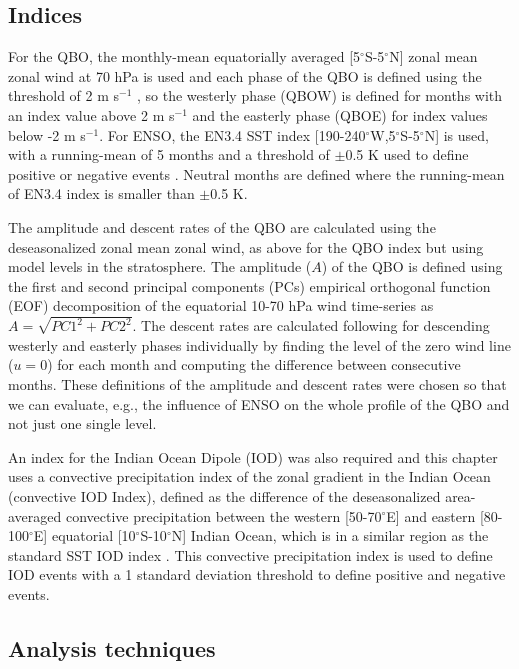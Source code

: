 \subsection{Indices}
\label{sq:indices}

For the QBO, the monthly-mean equatorially averaged [5$^\circ$S-5$^\circ$N] zonal mean zonal wind at 70 hPa is used  and each phase of the QBO is defined using the threshold of 2 m s$^{-1}$ \citep{garfinkel2010}, so the westerly phase (QBOW) is defined for months with an index value above 2 m s$^{-1}$ and the easterly phase (QBOE) for index values below -2 m s$^{-1}$. For ENSO, the EN3.4 SST index [190-240$^\circ$W,5$^\circ$S-5$^\circ$N] is used, with a running-mean of 5 months and a threshold of $\pm$0.5 K used to define positive or negative events \citep{trenberth1998}. Neutral months are defined where the running-mean of EN3.4 index is smaller than $\pm$0.5 K.

The amplitude and descent rates of the QBO are calculated using the deseasonalized zonal mean zonal wind, as above for the QBO index but using  model levels in the stratosphere.
The amplitude ($A$) of the QBO is defined using the first and second principal components (PCs)  empirical orthogonal function (EOF) decomposition of the equatorial 10-70 hPa wind time-series \citep{serva2020} as $A=\sqrt{PC1^2+PC2^2}$.
The descent rates are calculated following \cite{schenzinger2017} for descending westerly and easterly phases individually by finding the level of the zero wind line ($u=0$) for each month and computing the difference between consecutive months.
These definitions of the amplitude and descent rates were chosen so that we can evaluate, e.g., the influence of ENSO on the whole profile of the QBO and not just one single level. 

An index for the Indian Ocean Dipole (IOD) was also required and this chapter uses a convective precipitation index of the zonal gradient in the Indian Ocean (convective IOD Index), defined as the difference of the deseasonalized area-averaged convective precipitation between the western [50-70$^\circ$E] and eastern [80-100$^\circ$E] equatorial [10$^\circ$S-10$^\circ$N] Indian Ocean, which is in a similar region as the standard SST IOD index \citep{wang2014iod}. 
This convective precipitation index is used to define IOD events with a 1 standard deviation threshold to define positive and negative events. 

\subsection{Analysis techniques}
\label{sq:analysis}

